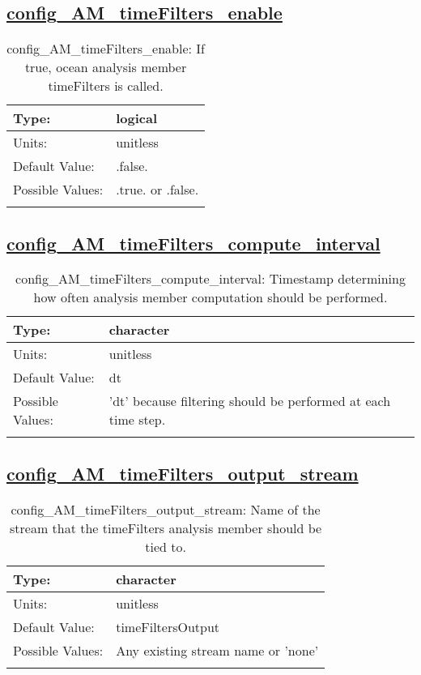 \subsection[config\_AM\_timeFilters\_enable]{\hyperref[sec:nm_tab_AM_timeFilters]{config\_AM\_timeFilters\_enable}}
\label{subsec:nm_sec_config_AM_timeFilters_enable}
\begin{center}
\begin{longtable}{| p{2.0in} || p{4.0in} |}
    \hline
    Type: & logical \\
    \hline
    Units: & \si{unitless} \\
    \hline
    Default Value: & .false. \\
    \hline
    Possible Values: & .true. or .false. \\
    \hline
    \caption{config\_AM\_timeFilters\_enable: If true, ocean analysis member timeFilters is called.}
\end{longtable}
\end{center}
\subsection[config\_AM\_timeFilters\_compute\_interval]{\hyperref[sec:nm_tab_AM_timeFilters]{config\_AM\_timeFilters\_compute\_interval}}
\label{subsec:nm_sec_config_AM_timeFilters_compute_interval}
\begin{center}
\begin{longtable}{| p{2.0in} || p{4.0in} |}
    \hline
    Type: & character \\
    \hline
    Units: & \si{unitless} \\
    \hline
    Default Value: & dt \\
    \hline
    Possible Values: & 'dt' because filtering should be performed at each time step. \\
    \hline
    \caption{config\_AM\_timeFilters\_compute\_interval: Timestamp determining how often analysis member computation should be performed.}
\end{longtable}
\end{center}
\subsection[config\_AM\_timeFilters\_output\_stream]{\hyperref[sec:nm_tab_AM_timeFilters]{config\_AM\_timeFilters\_output\_stream}}
\label{subsec:nm_sec_config_AM_timeFilters_output_stream}
\begin{center}
\begin{longtable}{| p{2.0in} || p{4.0in} |}
    \hline
    Type: & character \\
    \hline
    Units: & \si{unitless} \\
    \hline
    Default Value: & timeFiltersOutput \\
    \hline
    Possible Values: & Any existing stream name or 'none' \\
    \hline
    \caption{config\_AM\_timeFilters\_output\_stream: Name of the stream that the timeFilters analysis member should be tied to.}
\end{longtable}
\end{center}
